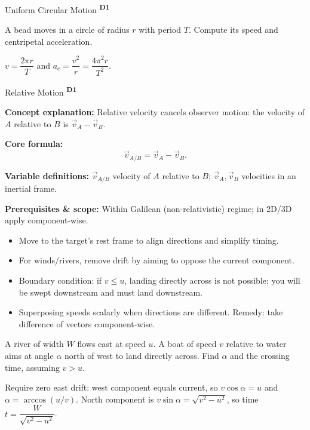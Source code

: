 ﻿\documentclass[12pt,a4paper]{article}
\providecommand{\KPFormulas}{}
\providecommand{\KPHeuristics}{}
\providecommand{\KPProblems}{}
\newcommand{\DOne}{\texorpdfstring{\textsuperscript{\textbf{D1}}}{ D1}}
\begin{document}
\begin{KnowledgePoint}{Uniform Circular Motion \DOne}
  \KPProblems
  \begin{cheatproblem}
  A bead moves in a circle of radius $r$ with period $T$. Compute its speed and centripetal acceleration.
  \begin{solutionbox}
  $v=\dfrac{2\pi r}{T}$ and $a_c=\dfrac{v^2}{r}=\dfrac{4\pi^2 r}{T^2}$.
  \end{solutionbox}
  \end{cheatproblem}
\end{KnowledgePoint}

\begin{KnowledgePoint}{Relative Motion \DOne}
  \KPFormulas
  \begin{formulabox}
  \textbf{Concept explanation:} Relative velocity cancels observer motion: the velocity of $A$ relative to $B$ is $\vec v_A-\vec v_B$.

  \textbf{Core formula:}
  \[
  \vec v_{A/B}=\vec v_A-\vec v_B.
  \]

  \textbf{Variable definitions:} $\vec v_{A/B}$ velocity of $A$ relative to $B$; $\vec v_A,\vec v_B$ velocities in an inertial frame.

  \textbf{Prerequisites \& scope:} Within Galilean (non-relativistic) regime; in 2D/3D apply component-wise.
  \end{formulabox}

  \KPHeuristics
  \begin{heuristicsbox}
  \begin{itemize}[leftmargin=*]
    \item Move to the target's rest frame to align directions and simplify timing.
    \item For winds/rivers, remove drift by aiming to oppose the current component.
    \item Boundary condition: if $v\le u$, landing directly across is not possible; you will be swept downstream and must land downstream.
  \end{itemize}
  \vspace{0.4em}
  \begin{itemize}[leftmargin=*]
    \item Superposing speeds scalarly when directions are different. Remedy: take difference of vectors component-wise.
  \end{itemize}
  \end{heuristicsbox}

  \KPProblems
  \begin{cheatproblem}
  A river of width $W$ flows east at speed $u$. A boat of speed $v$ relative to water aims at angle $\alpha$ north of west to land directly across. Find $\alpha$ and the crossing time, assuming $v>u$.
  \begin{solutionbox}
  Require zero east drift: west component equals current, so $v\cos\alpha=u$ and $\alpha=\arccos(u/v)$. North component is $v\sin\alpha=\sqrt{v^2-u^2}$, so time $t=\dfrac{W}{\sqrt{v^2-u^2}}$.
  \end{solutionbox}
  \end{cheatproblem}
\end{KnowledgePoint}
\end{document}

